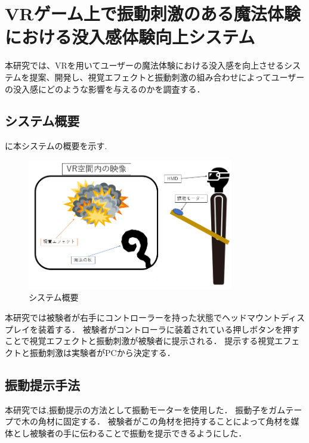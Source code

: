 \chapter{VRゲーム上で振動刺激のある魔法体験における没入感体験向上システム}
本研究では、VRを用いてユーザーの魔法体験における没入感を向上させるシステムを提案、開発し、視覚エフェクトと振動刺激の組み合わせによってユーザーの没入感にどのような影響を与えるのかを調査する．

\section{システム概要}
に本システムの概要を示す.
\begin{figure}[h]
\centering
\includegraphics[clip,width=9cm]{./fig/allsystem.png}
\caption{システム概要}\label{allsystem}
\end{figure}

本研究では被験者が右手にコントローラーを持った状態でヘッドマウントディスプレイを装着する．
被験者がコントローラに装着されている押しボタンを押すことで視覚エフェクトと振動刺激が被験者に提示される．
提示する視覚エフェクトと振動刺激は実験者がPCから決定する．

\section{振動提示手法}
本研究では,振動提示の方法として振動モーターを使用した．
振動子をガムテープで木の角材に固定する．
被験者がこの角材を把持することによって角材を媒体とし被験者の手に伝わることで振動を提示できるようにした．


